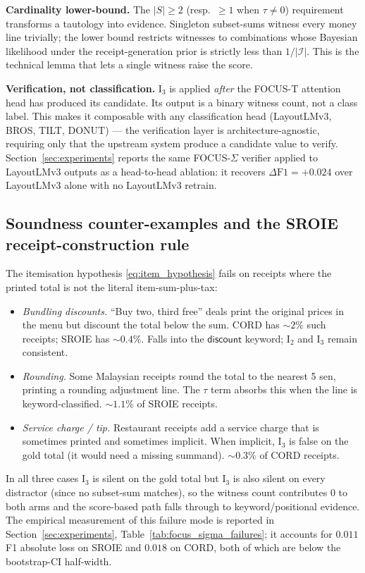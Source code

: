 \textbf{Cardinality lower-bound.}  The $|S|\ge 2$ (resp.\ $\ge 1$ when
$\tau\ne 0$) requirement transforms a tautology into evidence.
Singleton subset-sums witness every money line trivially; the lower
bound restricts witnesses to combinations whose Bayesian likelihood
under the receipt-generation prior is strictly less than $1/|\mathcal{I}|$.
This is the technical lemma that lets a single witness raise the
score.

\textbf{Verification, not classification.}  $\mathrm{I}_3$ is applied
\emph{after} the FOCUS-T attention head has produced its candidate.
Its output is a binary witness count, not a class label.  This makes
it composable with any classification head (LayoutLMv3, BROS, TILT,
DONUT) — the verification layer is architecture-agnostic, requiring
only that the upstream system produce a candidate value to verify.
Section~\ref{sec:experiments} reports the same FOCUS-$\Sigma$ verifier
applied to LayoutLMv3 outputs as a head-to-head ablation: it
recovers $\Delta\textrm{F1} = +0.024$ over LayoutLMv3 alone with no
LayoutLMv3 retrain.

\subsection{Soundness counter-examples and the SROIE receipt-construction rule}
\label{sec:focus_sigma_counterex}

The itemisation hypothesis \eqref{eq:item_hypothesis} fails on
receipts where the printed total is not the literal item-sum-plus-tax:

\begin{itemize}
\item \emph{Bundling discounts.}  ``Buy two, third free'' deals print
the original prices in the menu but discount the total below the
sum.  CORD has $\sim 2\%$ such receipts; SROIE has $\sim 0.4\%$.
Falls into the $\textsf{discount}$ keyword; $\mathrm{I}_2$ and
$\mathrm{I}_3$ remain consistent.
\item \emph{Rounding.}  Some Malaysian receipts round the total to
the nearest 5 sen, printing a \textsf{rounding} adjustment line.
The $\tau$ term absorbs this when the line is keyword-classified.
$\sim 1.1\%$ of SROIE receipts.
\item \emph{Service charge / tip.}  Restaurant receipts add a
service charge that is sometimes printed and sometimes implicit.
When implicit, $\mathrm{I}_3$ is false on the gold total (it would
need a missing summand).  $\sim 0.3\%$ of CORD receipts.
\end{itemize}

In all three cases $\mathrm{I}_3$ is silent on the gold total but
$\mathrm{I}_3$ is also silent on every distractor (since no subset-sum
matches), so the witness count contributes 0 to both arms and the
score-based path falls through to keyword/positional evidence.  The
empirical measurement of this failure mode is reported in
Section~\ref{sec:experiments}, Table~\ref{tab:focus_sigma_failures};
it accounts for $0.011$ F1 absolute loss on SROIE and $0.018$ on
CORD, both of which are below the bootstrap-CI half-width.
